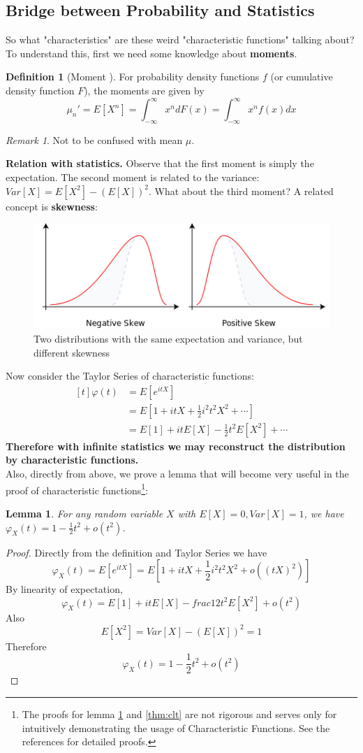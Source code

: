 \documentclass{article}
\theoremstyle{definition}
\newtheorem{definition}{Definition}[section]
\theoremstyle{plain}
\newtheorem{lemma}{Lemma}[section]
\theoremstyle{remark}
\newtheorem*{remark}{Remark}
\begin{document}
\subsection{Bridge between Probability and Statistics}
So what "characteristics" are these weird "characteristic functions" talking about? To understand this, first we need some knowledge about \textbf{moments}.
\begin{definition}[Moment \cite{wiki:moment}]
For probability density functions $f$ (or cumulative density function $F$), the moments are given by
$$\mu_n' = E[X^n] = \int_{-\infty}^\infty x^ndF(x) = \int_{-\infty}^\infty x^nf(x)dx $$
\end{definition}
\begin{remark}
Not to be confused with mean $\mu$. 
\end{remark}
\noindent\textbf{Relation with statistics.} Observe that the first moment is simply the expectation. The second moment is related to the variance: $Var[X]=E[X^2]-(E[X])^2$. What about the third moment? A related concept is \textbf{skewness}\cite{wiki:skewness}:
\begin{figure}[H]
	\centering
	\includegraphics[width=0.8\linewidth]{img/Negative_and_positive_skew_diagrams_(English)}
	\caption{Two distributions with the same expectation and variance, but different skewness} 
	\label{fig:skewness}
\end{figure}
Now consider the Taylor Series of characteristic functions:
$$\begin{aligned}[t]
\varphi(t) & =E[e^{itX}]  \\
& =E[1+itX+\frac12i^2t^2X^2+\cdots] \\
& =E[1] + itE[X]-\frac12t^2E[X^2] + \cdots
\end{aligned}$$
\textbf{Therefore with infinite statistics we may reconstruct the distribution by characteristic functions.}\\
Also, directly from above, we prove a lemma that will become very useful in the proof of characteristic functions\footnote{The proofs for lemma \ref{lem:clt} and \ref{thm:clt} are not rigorous and serves only for intuitively demonstrating the usage of Characteristic Functions. See the references\cite{waterloo,nus} for detailed proofs.}:
\begin{lemma}
	For any random variable $X$ with $E[X]=0,Var[X]=1$, we have $\varphi_X(t)=1-\frac12t^2+o(t^2)$.
	\label{lem:clt}
\end{lemma}
\begin{proof}
	Directly from the definition and Taylor Series we have
	$$\varphi_X(t)=E[e^{itX}]=E[1+itX+\frac12i^2t^2X^2+o((tX)^2)]$$
	By linearity of expectation,
	$$\varphi_X(t)=E[1]+itE[X]-frac12t^2E[X^2]+o(t^2)$$
	Also
	$$E[X^2]=Var[X]-(E[X])^2=1$$
	Therefore $$\varphi_X(t)=1-\frac12t^2+o(t^2)$$
\end{proof}
\end{document}

